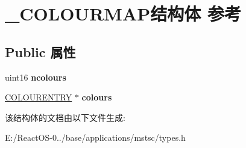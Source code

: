\hypertarget{struct___c_o_l_o_u_r_m_a_p}{}\section{\+\_\+\+C\+O\+L\+O\+U\+R\+M\+A\+P结构体 参考}
\label{struct___c_o_l_o_u_r_m_a_p}
\subsection*{Public 属性}
\begin{DoxyCompactItemize}
\item 
\mbox{\label{struct___c_o_l_o_u_r_m_a_p_a311a23d762766c5fa80c13ecedc429ee}} 
uint16 {\bfseries ncolours}
\item 
\mbox{\label{struct___c_o_l_o_u_r_m_a_p_a566ad2f0645e9219c3090f1e1a7b24ee}} 
\hyperlink{struct___c_o_l_o_u_r_e_n_t_r_y}{C\+O\+L\+O\+U\+R\+E\+N\+T\+RY} $\ast$ {\bfseries colours}
\end{DoxyCompactItemize}


该结构体的文档由以下文件生成\+:\begin{DoxyCompactItemize}
\item 
E\+:/\+React\+O\+S-\/0../base/applications/mstsc/types.\+h\end{DoxyCompactItemize}
